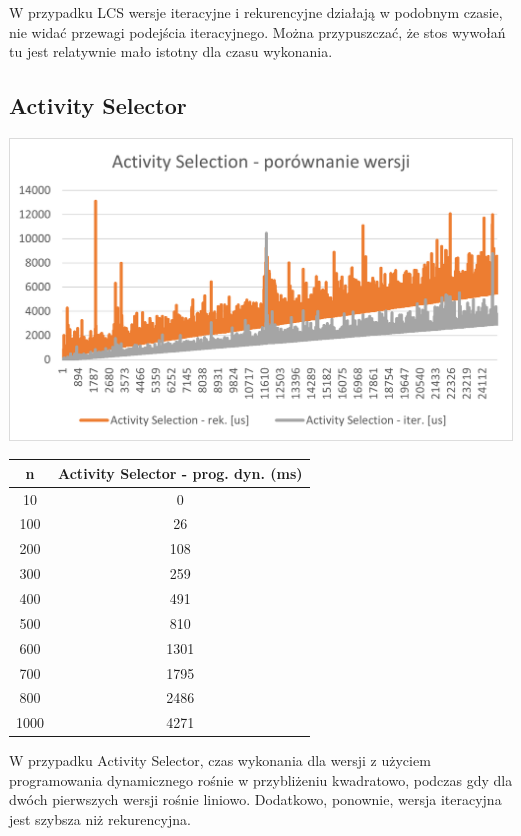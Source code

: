 \documentclass{article}
\begin{document}
W przypadku LCS wersje iteracyjne i rekurencyjne działają w podobnym czasie, nie widać przewagi podejścia iteracyjnego. Można przypuszczać, że stos wywołań tu jest relatywnie mało istotny dla czasu wykonania.

\subsection{Activity Selector}

\begin{center}
    \includegraphics[width=1\textwidth]{Activity Selection.png}

\begin{tabular}{c|c}
     \hline
     n & Activity Selector - prog. dyn. (ms) \\
     \hline
    10         & 0                   \\
    100        & 26                  \\
    200        & 108                 \\
    300        & 259                 \\
    400        & 491                 \\
    500        & 810                 \\
    600        & 1301                \\
    700        & 1795                \\
    800        & 2486                \\
    1000       & 4271                \\
    \hline
\end{tabular}
\end{center}

W przypadku Activity Selector, czas wykonania dla wersji z użyciem programowania dynamicznego rośnie w przybliżeniu kwadratowo, podczas gdy dla dwóch pierwszych wersji rośnie liniowo. Dodatkowo, ponownie, wersja iteracyjna jest szybsza niż rekurencyjna.
\end{document}
